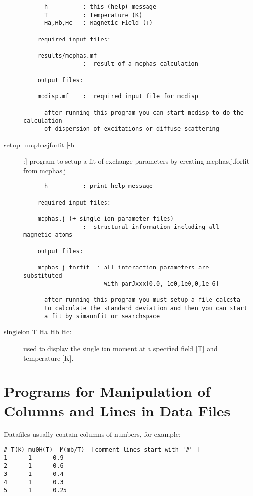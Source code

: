 \begin{description}
\begin{verbatim}
     -h          : this (help) message
      T          : Temperature (K)
      Ha,Hb,Hc   : Magnetic Field (T)

    required input files:

    results/mcphas.mf
                 :  result of a mcphas calculation

    output files:

    mcdisp.mf    :  required input file for mcdisp

    - after running this program you can start mcdisp to do the calculation
      of dispersion of excitations or diffuse scattering
\end{verbatim}
\item[\prg   setup\_mcphasjforfit\index{setup\_mcphasjforfit}  [-h]:] program to setup a fit of exchange parameters by   creating mcphas.j.forfit from mcphas.j
                    
\begin{verbatim}
     -h          : print help message

    required input files:

    mcphas.j (+ single ion parameter files)
                 :  structural information including all magnetic atoms

    output files:

    mcphas.j.forfit  : all interaction parameters are substituted
                       with parJxxx[0.0,-1e0,1e0,0,1e-6]

    - after running this program you must setup a file calcsta 
      to calculate the standard deviation and then you can start
      a fit by simannfit or searchspace
\end{verbatim}
\item [\prg singleion\index{singleion} T Ha Hb Hc:] used to display the single %
ion moment at a specified field [T] and temperature [K].
\end{description} 

\section{Programs for Manipulation of Columns and Lines in Data Files}

Datafiles usually contain columns of numbers, for example:

\begin{verbatim}
# T(K) mu0H(T)  M(mb/T)  [comment lines start with '#' ]
1      1      0.9
2      1      0.6
3      1      0.4
4      1      0.3
5      1      0.25
\end{verbatim}

